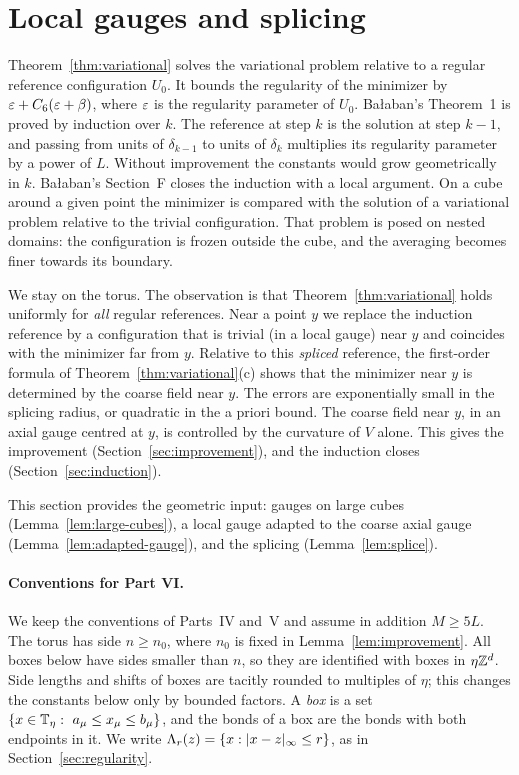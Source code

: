 \section{Local gauges and splicing}\label{sec:local-gauges}

Theorem~\ref{thm:variational} solves the variational problem relative to a regular reference configuration $U_0$. It bounds the regularity of the minimizer by $\varepsilon+C_6(\varepsilon+\beta)$, where $\varepsilon$ is the regularity parameter of $U_0$. Ba\l aban's Theorem~1 \cite{BalVar} is proved by induction over $k$. The reference at step $k$ is the solution at step $k-1$, and passing from units of $\delta_{k-1}$ to units of $\delta_k$ multiplies its regularity parameter by a power of $L$. Without improvement the constants would grow geometrically in $k$. Ba\l aban's Section~F \cite{BalVar} closes the induction with a local argument. On a cube around a given point the minimizer is compared with the solution of a variational problem relative to the trivial configuration. That problem is posed on nested domains: the configuration is frozen outside the cube, and the averaging becomes finer towards its boundary.

We stay on the torus. The observation is that Theorem~\ref{thm:variational} holds uniformly for \emph{all} regular references. Near a point $y$ we replace the induction reference by a configuration that is trivial (in a local gauge) near $y$ and coincides with the minimizer far from $y$. Relative to this \emph{spliced} reference, the first-order formula of Theorem~\ref{thm:variational}(c) shows that the minimizer near $y$ is determined by the coarse field near $y$. The errors are exponentially small in the splicing radius, or quadratic in the a priori bound. The coarse field near $y$, in an axial gauge centred at $y$, is controlled by the curvature of $V$ alone. This gives the improvement (Section~\ref{sec:improvement}), and the induction closes (Section~\ref{sec:induction}).

This section provides the geometric input: gauges on large cubes (Lemma~\ref{lem:large-cubes}), a local gauge adapted to the coarse axial gauge (Lemma~\ref{lem:adapted-gauge}), and the splicing (Lemma~\ref{lem:splice}).

\paragraph{Conventions for Part VI.} We keep the conventions of Parts~IV and~V and assume in addition $M\ge5L$. The torus has side $n\ge n_0$, where $n_0$ is fixed in Lemma~\ref{lem:improvement}. All boxes below have sides smaller than $n$, so they are identified with boxes in $\eta\mathbb Z^d$. Side lengths and shifts of boxes are tacitly rounded to multiples of $\eta$; this changes the constants below only by bounded factors. A \emph{box} is a set $\{x\in\mathbb T_\eta:\ a_\mu\le x_\mu\le b_\mu\}$, and the bonds of a box are the bonds with both endpoints in it. We write $\Lambda_r(z)=\{x:|x-z|_\infty\le r\}$, as in Section~\ref{sec:regularity}.

